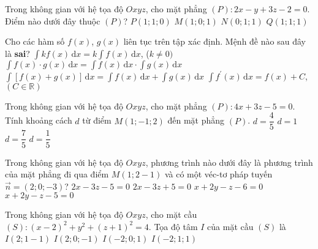 \begin{ex}%
Trong không gian với hệ tọa độ $Oxyz$, cho mặt phẳng $(P) \colon 2x-y+3z-2=0$. Điểm nào dưới đây thuộc $(P)$?
\choice
{$P(1;1;0)$}
{$M(1;0;1)$}
{\True $N(0;1;1)$}
{$Q(1;1;1)$}
\end{ex}
\begin{ex}%
Cho các hàm số $f(x)$, $g(x)$ liên tục trên tập xác định. Mệnh đề nào sau đây là {\bf sai}?
\choice
{$\displaystyle \int kf(x) \mathrm{\, d}x=k\displaystyle \int f(x) \mathrm{\, d}x$, ($k\neq 0)$}
{\True $\displaystyle \int f(x)\cdot g(x) \mathrm{\, d}x=\displaystyle \int f(x) \mathrm{\, d}x \cdot \displaystyle \int g(x) \mathrm{\, d}x$}
{$\displaystyle \int \left[f(x)+g(x)\right] \mathrm{\, d}x=\displaystyle \int f(x) \mathrm{\, d}x+ \displaystyle \int g(x) \mathrm{\, d}x$}
{$\displaystyle \int f^\prime (x) \mathrm{\, d}x = f(x) + C$, $(C \in \mathbb{R})$}
\end{ex}
\begin{ex}%
Trong không gian với hệ tọa độ $Oxyz$, cho mặt phẳng $(P)\colon 4x+3z-5=0$. Tính khoảng cách $d$ từ điểm $M(1;-1;2)$ đến mặt phẳng $(P)$.
\choice
{$d=\dfrac{4}{5}$}
{\True $d=1$}
{$d=\dfrac{7}{5}$}
{$d=\dfrac{1}{5}$}
\end{ex}
\begin{ex}%
Trong không gian với hệ tọa độ $Oxyz$, phương trình nào dưới đây là phương trình của mặt phẳng đi qua điểm $M(1;2-1)$ và có một véc-tơ pháp tuyến $\overrightarrow{n}=(2;0;-3)$?
\choice
{\True $2x-3z-5=0$}
{$2x-3z+5=0$}
{$x+2y-z-6=0$}
{$x+2y-z-5=0$}
\end{ex}
\begin{ex}%
Trong không gian với hệ tọa độ $Oxyz$, cho mặt cầu $(S)\colon (x-2)^2 + y^2 + (z+1)^2 = 4$. Tọa độ tâm $I$ của mặt cầu $(S)$ là
\choice
{$I(2;1-1)$}
{\True $I(2;0;-1)$}
{$I(-2;0;1)$}
{$I(-2;1;1)$}
\end{ex}
